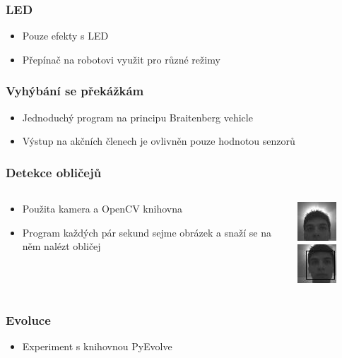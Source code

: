 \documentclass{beamer}
\begin{document}
\begin{frame}
    \frametitle{LED}
    \begin{itemize}
        \item Pouze efekty s LED
        \item Přepínač na robotovi využit pro různé režimy
    \end{itemize}
\end{frame}

\begin{frame}
    \frametitle{Vyhýbání se překážkám}
    \begin{itemize}
        \item Jednoduchý program na principu Braitenberg vehicle
        \item Výstup na akčních členech je ovlivněn pouze hodnotou senzorů
    \end{itemize}
\end{frame}

\begin{frame}
    \frametitle{Detekce obličejů}
    \begin{columns}
        \begin{column}{0.6\textwidth}
            \begin{itemize}
                \item Použita kamera a OpenCV knihovna
                \item Program každých pár sekund sejme obrázek a snaží se na něm nalézt obličej
            \end{itemize}
        \end{column}

        \begin{column}{0.4\textwidth}
            \includegraphics[scale=1]{face1.jpg}
            \hskip1cm
            \includegraphics[scale=1]{face2.jpg}
        \end{column}
    \end{columns}
\end{frame}

\begin{frame}
    \frametitle{Evoluce}
    \begin{itemize}
        \item Experiment s knihovnou PyEvolve
    \end{itemize}
\end{frame}
\end{document}
